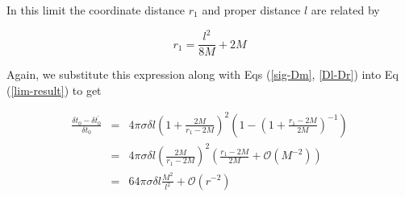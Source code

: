 \documentclass[aps,showpacs,onecolumn,floats,prd,superscriptaddress,nofootinbib]{revtex4-1}
\begin{document}
In this limit the coordinate distance $r_1$ and proper distance $l$ are related by

\begin{equation}
	r_1 = \frac{l^2}{8M} + 2M
\end{equation}

Again, we substitute this expression along with Eqs (\ref{sig-Dm}, \ref{Dl-Dr}) into Eq (\ref{lim-result}) to get 

\begin{eqnarray}
	\frac{\delta t_0 - \delta \bar{t_0}}{\delta t_0} & = &  4 \pi \sigma \delta l \left( 1+ \frac{2M}{r_1 - 2M} \right)^2 \left( 1 - \left( 1 + \frac{r_1 - 2M}{2M} \right)^{-1} \right)	\nonumber	\\
	& =& 4 \pi \sigma \delta l \left( \frac{2M}{r_1 - 2M}\right)^2 \left( \frac{r_1 - 2M}{2M}  + \mathcal{O}(M^{-2}) \right)	\nonumber	\\
	& = & 64 \pi \sigma \delta l \frac{M^2}{l^2} + \mathcal{O}(r^{-2})
\end{eqnarray}
\end{document}
